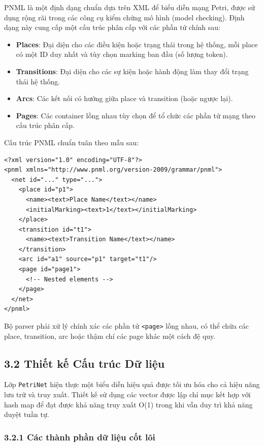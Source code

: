 \documentclass[12pt,a4paper]{article}
\begin{document}
PNML là một định dạng chuẩn dựa trên XML để biểu diễn mạng Petri, được sử dụng rộng rãi trong các công cụ kiểm chứng mô hình (model checking). Định dạng này cung cấp một cấu trúc phân cấp với các phần tử chính sau:

\begin{itemize}
    \item \textbf{Places}: Đại diện cho các điều kiện hoặc trạng thái trong hệ thống, mỗi place có một ID duy nhất và tùy chọn marking ban đầu (số lượng token).
    \item \textbf{Transitions}: Đại diện cho các sự kiện hoặc hành động làm thay đổi trạng thái hệ thống.
    \item \textbf{Arcs}: Các kết nối có hướng giữa place và transition (hoặc ngược lại).
    \item \textbf{Pages}: Các container lồng nhau tùy chọn để tổ chức các phần tử mạng theo cấu trúc phân cấp.
\end{itemize}

Cấu trúc PNML chuẩn tuân theo mẫu sau:

\begin{verbatim}
<?xml version="1.0" encoding="UTF-8"?>
<pnml xmlns="http://www.pnml.org/version-2009/grammar/pnml">
  <net id="..." type="...">
    <place id="p1">
      <name><text>Place Name</text></name>
      <initialMarking><text>1</text></initialMarking>
    </place>
    <transition id="t1">
      <name><text>Transition Name</text></name>
    </transition>
    <arc id="a1" source="p1" target="t1"/>
    <page id="page1">
      <!-- Nested elements -->
    </page>
  </net>
</pnml>
\end{verbatim}

Bộ parser phải xử lý chính xác các phần tử \texttt{<page>} lồng nhau, có thể chứa các place, transition, arc hoặc thậm chí các page khác một cách đệ quy.

\subsection*{3.2 Thiết kế Cấu trúc Dữ liệu}

Lớp \texttt{PetriNet} hiện thực một biểu diễn hiệu quả được tối ưu hóa cho cả hiệu năng lưu trữ và truy xuất. Thiết kế sử dụng các vector được lập chỉ mục kết hợp với hash map để đạt được khả năng truy xuất O(1) trong khi vẫn duy trì khả năng duyệt tuần tự.

\subsubsection*{3.2.1 Các thành phần dữ liệu cốt lõi}
\end{document}
